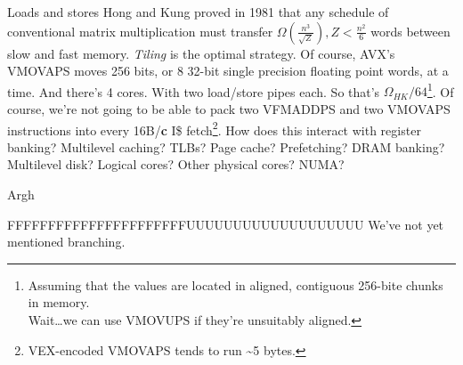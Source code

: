 \documentclass[mathserif,xcolor={dvipsnames,table}]{beamer}
\begin{document}
\begin{frame}{Loads and stores}
Hong and Kung proved in 1981 that any schedule of conventional matrix
multiplication must transfer $\Omega(\frac{n^{3}}{\sqrt{Z}}), Z<\frac{n^{2}}{6}$
words between slow and fast memory. \textit{Tiling} is the optimal strategy.
\vfill
Of course, AVX's VMOVAPS moves 256 bits, or 8 32-bit single precision floating
point words, at a time. And there's 4 cores. With two load/store pipes each. So that's $\Omega_{HK}/64$\footnote{
\tiny{Assuming that the values are located in aligned, contiguous 256-bite chunks in memory.\\
\hspace{.6cm}Wait\ldots we can use VMOVUPS if they're unsuitably aligned.}}.
\vfill
Of course, we're not going to be able to pack two VFMADDPS and two VMOVAPS
instructions into every 16B/\textbf{c} I\$ fetch\footnote{\tiny{VEX-encoded
VMOVAPS tends to run \textasciitilde 5 bytes.}}.
\vfill
How does this interact with register banking? Multilevel caching? TLBs? Page
cache? Prefetching? DRAM banking? Multilevel disk? Logical cores? Other physical cores?
NUMA?
\end{frame}

{
%
\begin{frame}{Argh}
\begin{block}{FFFFFFFFFFFFFFFFFFFFFFUUUUUUUUUUUUUUUUUUU}
We've not yet mentioned branching.
\end{block}
\end{frame}
}
\end{document}
